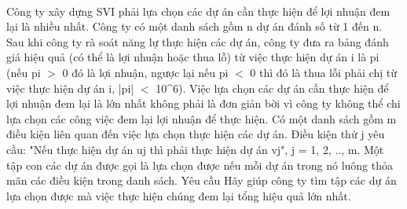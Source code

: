  

Công ty xây dựng SVI phải lựa chọn các dự án cần thực hiện để lợi nhuận đem lại là nhiều nhất. Công ty có một danh sách gồm n dự án đánh số từ 1 đến n. Sau khi công ty rà soát năng lự thực hiện các dự án, công ty đưa ra bảng đánh giá hiệu quả (có thể là lợi nhuận hoặc thua lỗ) từ việc thực hiện dự án i là pi (nếu pi $>$ 0 đó là lợi nhuận, ngược lại nếu pi $<$ 0 thì đó là thua lỗi phải chị từ việc thực hiện dự án i, |pi| $<$ 10^6). Việc lựa chọn các dự án cần thực hiện để lợi nhuận đem lại là lớn nhất không phải là đơn giản bời vì công ty không thể chi lựa chọn các công việc đem lại lợi nhuận để thực hiện. Có một danh sách gồm m điều kiện liên quan đến việc lựa chọn thực hiện các dự án. Điều kiện thứ j yêu cầu: "Nếu thực hiện dự án uj thì phải thực hiện dự án vj", j = 1, 2, .., m. Một tập con các dự án được gọi là lựa chọn được nếu mỗi dự án trong nó luông thỏa mãn các điều kiện trong danh sách.
Yêu cầu
Hãy giúp công ty tìm tập các dự án lựa chọn được mà việc thực hiện chúng đem lại tổng hiệu quả lớn nhất.